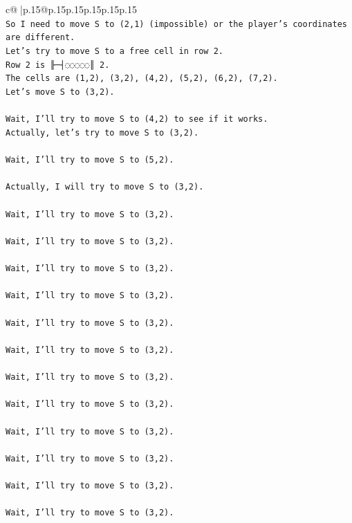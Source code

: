 \documentclass{article}
\begin{document}
{\begin{supertabular}{c@{$\;$}|p{.15\linewidth}@{}p{.15\linewidth}p{.15\linewidth}p{.15\linewidth}p{.15\linewidth}p{.15\linewidth}}
{{{\\ 
\texttt{So I need to move S to (2,1) (impossible) or the player's coordinates are different.} \\
\texttt{Let's try to move S to a free cell in row 2.} \\
\texttt{Row 2 is ╟─┤◌◌◌◌◌║ 2.} \\
\texttt{The cells are (1,2), (3,2), (4,2), (5,2), (6,2), (7,2).} \\
\texttt{Let's move S to (3,2).} \\
\\ 
\texttt{Wait, I'll try to move S to (4,2) to see if it works.} \\
\texttt{Actually, let's try to move S to (3,2).} \\
\\ 
\texttt{Wait, I'll try to move S to (5,2).} \\
\\ 
\texttt{Actually, I will try to move S to (3,2).} \\
\\ 
\texttt{Wait, I'll try to move S to (3,2).} \\
\\ 
\texttt{Wait, I'll try to move S to (3,2).} \\
\\ 
\texttt{Wait, I'll try to move S to (3,2).} \\
\\ 
\texttt{Wait, I'll try to move S to (3,2).} \\
\\ 
\texttt{Wait, I'll try to move S to (3,2).} \\
\\ 
\texttt{Wait, I'll try to move S to (3,2).} \\
\\ 
\texttt{Wait, I'll try to move S to (3,2).} \\
\\ 
\texttt{Wait, I'll try to move S to (3,2).} \\
\\ 
\texttt{Wait, I'll try to move S to (3,2).} \\
\\ 
\texttt{Wait, I'll try to move S to (3,2).} \\
\\ 
\texttt{Wait, I'll try to move S to (3,2).} \\
\\ 
\texttt{Wait, I'll try to move S to (3,2).} \\
}}}
\end{supertabular}}
\end{document}
